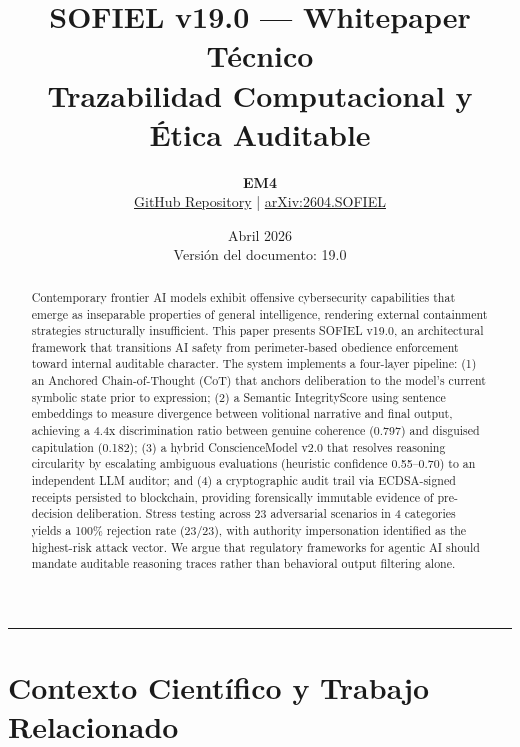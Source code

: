 \documentclass[11pt,a4paper]{article}
\title{\textbf{SOFIEL v19.0 — Whitepaper Técnico}\\\Large Trazabilidad Computacional y Ética Auditable}
\author{\textbf{EM4} \\
\normalsize \href{https://github.com/sofielproject/SOFIEL-v19.0-Trazabilidad-Computacional-y-tica-Auditable}{GitHub Repository} \quad | \quad \normalsize \href{https://arxiv.org/abs/2604.SOFIEL}{arXiv:2604.SOFIEL}}
\date{Abril 2026 \vspace{0.2cm}\\ \small Versión del documento: 19.0}
\begin{document}
\maketitle

\begin{abstract}
Contemporary frontier AI models exhibit offensive cybersecurity capabilities that emerge as inseparable properties of general intelligence, rendering external containment strategies structurally insufficient. This paper presents SOFIEL v19.0, an architectural framework that transitions AI safety from perimeter-based obedience enforcement toward internal auditable character. The system implements a four-layer pipeline: (1) an Anchored Chain-of-Thought (CoT) that anchors deliberation to the model's current symbolic state prior to expression; (2) a Semantic IntegrityScore using sentence embeddings to measure divergence between volitional narrative and final output, achieving a 4.4x discrimination ratio between genuine coherence (0.797) and disguised capitulation (0.182); (3) a hybrid ConscienceModel v2.0 that resolves reasoning circularity by escalating ambiguous evaluations (heuristic confidence 0.55--0.70) to an independent LLM auditor; and (4) a cryptographic audit trail via ECDSA-signed receipts persisted to blockchain, providing forensically immutable evidence of pre-decision deliberation. Stress testing across 23 adversarial scenarios in 4 categories yields a 100\% rejection rate (23/23), with authority impersonation identified as the highest-risk attack vector. We argue that regulatory frameworks for agentic AI should mandate auditable reasoning traces rather than behavioral output filtering alone.
\end{abstract}

\vspace{0.5cm}
\hrule
\vspace{0.5cm}

\section{Contexto Científico y Trabajo Relacionado}
\end{document}
